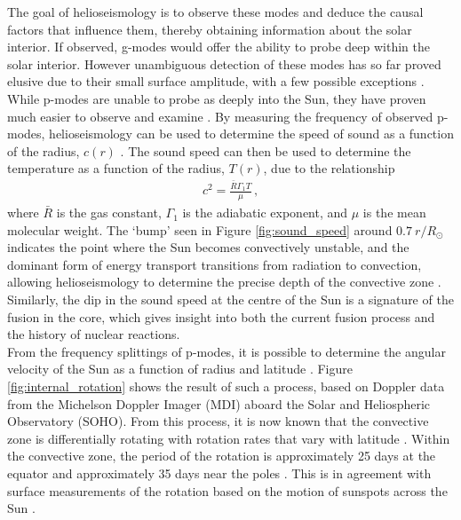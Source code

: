 \documentclass[11pt,a4paper,onecolumn]{report}
\begin{document}
The goal of helioseismology is to observe these modes and deduce the causal
factors that influence them, thereby obtaining information about the solar
interior. If observed, g-modes would offer the ability to probe deep within the
solar interior. However unambiguous detection of these modes has so far proved
elusive due to their small surface amplitude, with a few possible exceptions
\citep{garcia_tracking_2007,fossat_asymptotic_2017}. While p-modes are unable
to probe as deeply into the Sun, they have proven much easier to observe and
examine \citep{deubner_observations_1975}. By measuring the frequency of
observed p-modes, helioseismology can be used to determine the speed of sound as
a function of the radius, \(c\left(r\right)\)
\citep{christensen-dalsgaard_speed_1985}. The sound speed can then be used to
determine the temperature as a function of the radius, \(T\left(r\right)\), due
to the relationship
\begin{align}
  c^2 = \frac{\bar{R}\Gamma_1 T}{\mu} \,,
\end{align}
where \(\bar{R}\) is the gas constant, \(\Gamma_1\) is the adiabatic exponent,
and \(\mu\) is the mean molecular weight. The `bump' seen in Figure
\ref{fig:sound_speed} around \(\SI{0.7}{r \per R_\odot}\) indicates the point where the
Sun becomes convectively unstable, and the dominant form of energy transport
transitions from radiation to convection, allowing helioseismology to determine
the precise depth of the convective zone
\citep{christensen-dalsgaard_speed_1985}. Similarly, the dip in the sound speed
at the centre of the Sun is a signature of the fusion in the core, which gives
insight into both the current fusion process and the history of nuclear
reactions. \\




From the frequency splittings of p-modes, it is possible to determine the
angular velocity of the Sun as a function of radius and latitude
\citep{schou_helioseismic_1998}. Figure \ref{fig:internal_rotation} shows the
result of such a process, based on Doppler data from the Michelson Doppler
Imager (MDI) aboard the Solar and Heliospheric Observatory (SOHO). From this
process, it is now known that the convective zone is differentially rotating
with rotation rates that vary with latitude \citep{eff2012dynamics}. Within the
convective zone, the period of the rotation is approximately 25 days at the
equator and approximately 35 days near the poles \citep{hughes2007solar}. This
is in agreement with surface measurements of the rotation based on the motion of
sunspots across the Sun \citep{schou_helioseismic_1998}. \\
\end{document}
